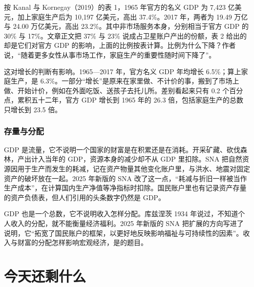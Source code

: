 按 Kanal 与 Kornegay（2019）的表 1，1965 年官方的名义 GDP 为 7,423 亿美元，加上家庭生产后为 10,197 亿美元，高出 37.4\%。2017 年，两者为 19.49 万亿与 24.00 万亿美元，高出 23.2\%。其中非市场服务本身，分别相当于官方 GDP 的 30\% 与 17\%。文章正文把 37\% 与 23\% 说成占卫星账户产出的份额，表 2 给出的却是它们对官方 GDP 的影响，上面的比例按表计算。比例为什么下降？作者说，“随着更多女性从事市场工作，家庭生产的重要性随时间下降了”\cite{kk2019}。

这对增长的判断有影响。1965—2017 年，官方名义 GDP 年均增长 6.5\%；算上家庭生产，是 6.3\%\cite{kk2019}。一部分“增长”是原来在家里做、不计价的事，搬到了市场上做、开始计价，例如在外面吃饭、送孩子去托儿所。差别看起来只有 0.2 个百分点，累积五十二年，官方 GDP 增长到 1965 年的 26.3 倍，包括家庭生产的总数只增长到 23.5 倍。

\subsubsection{存量与分配}
GDP 是流量，它不说明一个国家的财富是在积累还是在消耗。开采矿藏、砍伐森林，产出计入当年的 GDP，资源本身的减少却不从 GDP 里扣除。SNA 把自然资源因用于生产而发生的耗减，记在资产物量其他变化账户里，与洪水、地震对固定资产的破坏放在一起\cite{sna2008}。2025 年新版的 SNA 改了这一点，“耗减与折旧一样被当作生产成本”，在计算国内生产净值等净指标时扣除\cite{sna2025}。国民账户里也有记录资产存量的资产负债表，但人们引用的头条数字仍然是 GDP。

GDP 也是一个总数，它不说明收入怎样分配。库兹涅茨 1934 年说过，不知道个人收入的分配，就不能衡量经济福利\cite{kuznets1934}。2025 年新版的 SNA 把扩展的方向写进了说明，它“拓宽了国民账户的框架，以更好地反映影响福祉与可持续性的因素”\cite{un2025sna}。收入与财富的分配怎样影响宏观经济，是的题目。

\section{今天还剩什么}\label{sec:accounts-legacy}

